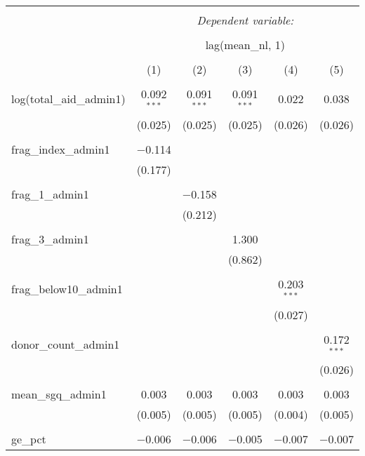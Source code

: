 
\begin{table}[!htbp] \centering 
  \caption{} 
  \label{} 
\begin{tabular}{@{\extracolsep{5pt}}lccccc} 
\\[-1.8ex]\hline 
\hline \\[-1.8ex] 
 & \multicolumn{5}{c}{\textit{Dependent variable:}} \\ 
\cline{2-6} 
\\[-1.8ex] & \multicolumn{5}{c}{lag(mean\_nl, 1)} \\ 
\\[-1.8ex] & (1) & (2) & (3) & (4) & (5)\\ 
\hline \\[-1.8ex] 
 log(total\_aid\_admin1) & 0.092$^{***}$ & 0.091$^{***}$ & 0.091$^{***}$ & 0.022 & 0.038 \\ 
  & (0.025) & (0.025) & (0.025) & (0.026) & (0.026) \\ 
  & & & & & \\ 
 frag\_index\_admin1 & $-$0.114 &  &  &  &  \\ 
  & (0.177) &  &  &  &  \\ 
  & & & & & \\ 
 frag\_1\_admin1 &  & $-$0.158 &  &  &  \\ 
  &  & (0.212) &  &  &  \\ 
  & & & & & \\ 
 frag\_3\_admin1 &  &  & 1.300 &  &  \\ 
  &  &  & (0.862) &  &  \\ 
  & & & & & \\ 
 frag\_below10\_admin1 &  &  &  & 0.203$^{***}$ &  \\ 
  &  &  &  & (0.027) &  \\ 
  & & & & & \\ 
 donor\_count\_admin1 &  &  &  &  & 0.172$^{***}$ \\ 
  &  &  &  &  & (0.026) \\ 
  & & & & & \\ 
 mean\_sgq\_admin1 & 0.003 & 0.003 & 0.003 & 0.003 & 0.003 \\ 
  & (0.005) & (0.005) & (0.005) & (0.004) & (0.005) \\ 
  & & & & & \\ 
 ge\_pct & $-$0.006 & $-$0.006 & $-$0.005 & $-$0.007 & $-$0.007 \\ 

\end{tabular}
\end{table}

